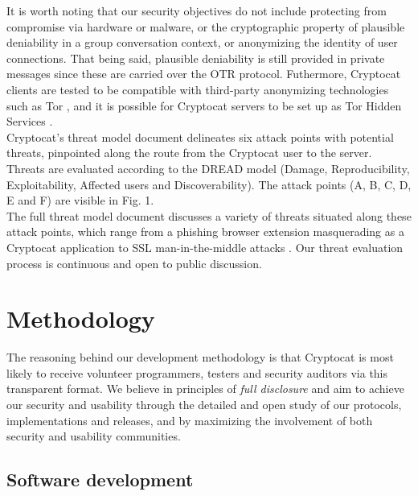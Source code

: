 \documentclass[letterpaper,twocolumn,10pt]{article}
\begin{document}
It is worth noting that our security objectives do not include protecting from compromise via hardware or malware, or the cryptographic property of plausible deniability in a group conversation context, or anonymizing the identity of user connections. That being said, plausible deniability is still provided in private messages since these are carried over the OTR protocol. Futhermore, Cryptocat clients are tested to be compatible with third-party anonymizing technologies such as Tor \cite{tor}, and it is possible for Cryptocat servers to be set up as Tor Hidden Services \cite{tor-rendezvous}.  \\
Cryptocat's threat model document \cite{threatmodel} delineates six attack points with potential threats, pinpointed along the route from the Cryptocat user to the server. Threats are evaluated according to the DREAD model \cite{dread} (Damage, Reproducibility, Exploitability, Affected users and Discoverability). The attack points (A, B, C, D, E and F) are visible in Fig. 1.\\
The full threat model document \cite{threatmodel} discusses a variety of threats situated along these attack points, which range from a phishing browser extension masquerading as a Cryptocat application to SSL man-in-the-middle attacks \cite{schneier-ssl}. Our threat evaluation process is continuous and open to public discussion.

\section{Methodology}

The reasoning behind our development methodology is that Cryptocat is most likely to receive volunteer programmers, testers and security auditors via this transparent format. We believe in principles of \emph{full disclosure} and aim to achieve our security and usability through the detailed and open study of our protocols, implementations and releases, and by maximizing the involvement of both security and usability communities.

\subsection{Software development}
\end{document}
